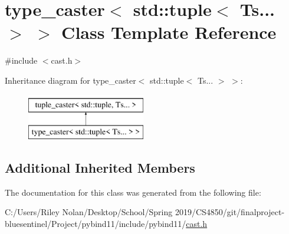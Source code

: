 \hypertarget{classtype__caster_3_01std_1_1tuple_3_01_ts_8_8_8_01_4_01_4}{}\section{type\+\_\+caster$<$ std\+::tuple$<$ Ts... $>$ $>$ Class Template Reference}
\label{classtype__caster_3_01std_1_1tuple_3_01_ts_8_8_8_01_4_01_4}


{\ttfamily \#include $<$cast.\+h$>$}

Inheritance diagram for type\+\_\+caster$<$ std\+::tuple$<$ Ts... $>$ $>$\+:\begin{figure}[H]
\begin{center}
\leavevmode
\includegraphics[height=2.000000cm]{classtype__caster_3_01std_1_1tuple_3_01_ts_8_8_8_01_4_01_4}
\end{center}
\end{figure}
\subsection*{Additional Inherited Members}


The documentation for this class was generated from the following file\+:\begin{DoxyCompactItemize}
\item 
C\+:/\+Users/\+Riley Nolan/\+Desktop/\+School/\+Spring 2019/\+C\+S4850/git/finalproject-\/bluesentinel/\+Project/pybind11/include/pybind11/\mbox{\hyperlink{cast_8h}{cast.\+h}}\end{DoxyCompactItemize}
